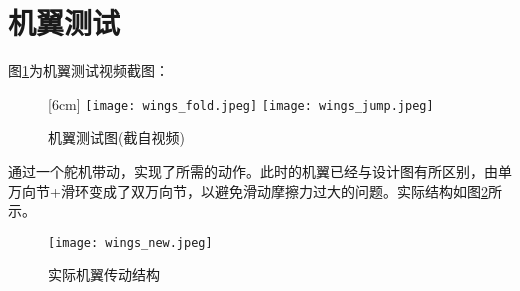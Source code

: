 \section{机翼测试}
图\ref{fig:wings_test}为机翼测试视频截图：
\begin{figure}[H]
  \centering
  [6cm] 
    {\texttt{[image: wings\_fold.jpeg]}}
  \hspace{4em}
      {\texttt{[image: wings\_jump.jpeg]}}
  \caption{机翼测试图(截自视频)}
  \label{fig:wings_test}
\end{figure}
通过一个舵机带动，实现了所需的动作。此时的机翼已经与设计图有所区别，由单万向节+滑环变成了双万向节，以避免滑动摩擦力过大的问题。实际结构如图\ref{fig:wings_new}所示。
\begin{figure}[H]
  \centering%
  \texttt{[image: wings\_new.jpeg]}
  \caption{实际机翼传动结构}
  \label{fig:wings_new}
\end{figure}
